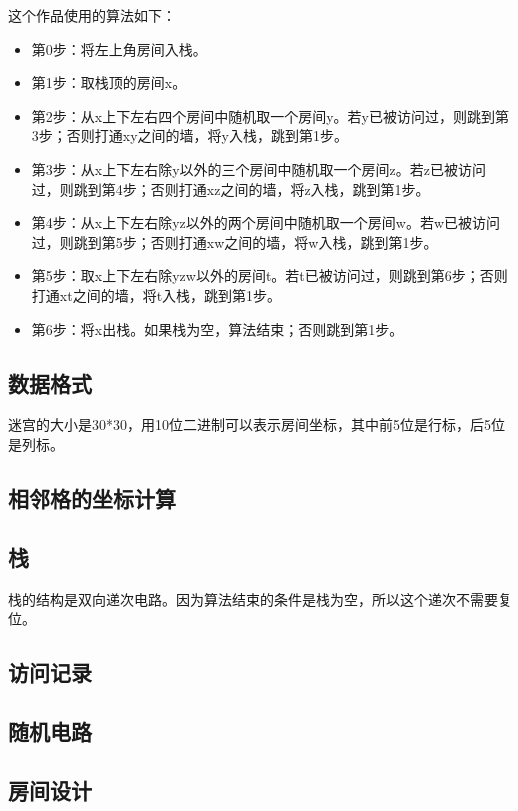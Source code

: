 这个作品使用的算法如下：
\begin{itemize}
  \item 第0步：将左上角房间入栈。
  \item 第1步：取栈顶的房间x。
  \item 第2步：从x上下左右四个房间中随机取一个房间y。若y已被访问过，则跳到第3步；否则打通xy之间的墙，将y入栈，跳到第1步。
  \item 第3步：从x上下左右除y以外的三个房间中随机取一个房间z。若z已被访问过，则跳到第4步；否则打通xz之间的墙，将z入栈，跳到第1步。
  \item 第4步：从x上下左右除yz以外的两个房间中随机取一个房间w。若w已被访问过，则跳到第5步；否则打通xw之间的墙，将w入栈，跳到第1步。
  \item 第5步：取x上下左右除yzw以外的房间t。若t已被访问过，则跳到第6步；否则打通xt之间的墙，将t入栈，跳到第1步。
  \item 第6步：将x出栈。如果栈为空，算法结束；否则跳到第1步。
\end{itemize}

\subsection{数据格式}
迷宫的大小是30*30，用10位二进制可以表示房间坐标，其中前5位是行标，后5位是列标。

\subsection{相邻格的坐标计算}

\subsection{栈}
栈的结构是双向递次电路。因为算法结束的条件是栈为空，所以这个递次不需要复位。

\subsection{访问记录}

\subsection{随机电路}

\subsection{房间设计}